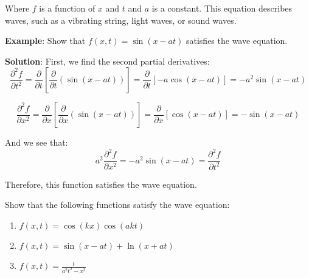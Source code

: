 Where $f$ is a function of $x$ and $t$ and $a$ is a constant. This equation 
describes waves, such as a vibrating string, light waves, or sound waves. 

\textbf{Example}: Show that $f(x, t) = \sin{ \left( x - at \right)}$ satisfies 
the wave equation. 

\textbf{Solution}: First, we find the second partial derivatives:
$$\frac{\partial^2 f}{\partial t^2} = \frac{\partial}{\partial t} \left[ \frac{
\partial}{\partial t} \left( \sin{ \left( x - at \right)} \right) \right] = 
\frac{\partial}{\partial t} \left[ -a\cos{\left(x - at \right)} \right] = -a^2
\sin{\left(x - at \right)}$$

$$\frac{\partial^2 f}{\partial x^2} = \frac{\partial}{\partial x} \left[ \frac{
\partial}{\partial x} \left( \sin{ \left( x - at \right)} \right) \right] = 
\frac{\partial}{\partial x} \left[ \cos{\left( x - at \right)}\right] = -\sin{
\left( x - at \right)}$$

And we see that:
$$a^2 \frac{\partial^2 f}{\partial x^2} = -a^2 \sin{\left(x - at \right)} = 
\frac{\partial^2 f}{\partial t^2}$$

Therefore, this function satisfies the wave equation. 

\begin{Exercise}[title = {The Wave Equation}, label = wave]
Show that the following functions satisfy the wave equation:
\begin{enumerate}
    \item $f(x, t) = \cos{\left(kx \right)}\cos{\left(akt \right)}$
    \item $f(x, t) = \sin{\left( x - at \right)} + \ln{ \left( x + at 
    \right)}$
    \item $f(x, t) = \frac{t}{a^2t^2 - x^2}$
\end{enumerate}
\vspace{50mm}
\end{Exercise}

